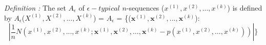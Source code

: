 \documentclass[preview]{standalone}
\begin{document}
\begin{center}
\textit{Definition :} The set $A_{\epsilon}$ of $\epsilon -typical$ $n$-sequences ($x^{(1)},x^{(2)},...,x^{(k)}$) is defined by $A_{\epsilon}$($X^{(1)},X^{(2)},...,X^{(k)}$) = $A_{\epsilon}$ = \{($\textbf{x}^{(1)},\textbf{x}^{(2)},...,\textbf{x}^{(k)}$):$$|\frac{1}{n} N ( x^{(1)},x^{(2)},...,x^{(k)};\textbf{x}^{(1)},\textbf{x}^{(2)},...,\textbf{x}^{(k)} - p(x^{(1)},x^{(2)},...,x^{(k)}) )| \}$$
\end{center}
\end{document}
